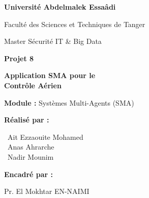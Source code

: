 \documentclass[12pt,a4paper]{article}
\begin{document}
\begin{titlepage}

    \centering
    \vspace*{1.5cm}

    {\color{white}\LARGE\bfseries Université Abdelmalek Essaâdi\par}
    \vspace{0.3cm}
    {\color{white}\Large Faculté des Sciences et Techniques de Tanger\par}
    \vspace{0.5cm}
    {\color{white}\large Master Sécurité IT \& Big Data\par}

    \vspace{3cm}

    {\color{primaryblue}\Huge\bfseries Projet 8\par}
    \vspace{0.8cm}
    {\color{darkblue}\LARGE\bfseries Application SMA pour le\\Contrôle Aérien\par}

    \vspace{1cm}
    \begin{tcolorbox}[colback=lightblue!30, colframe=primaryblue, width=0.8\textwidth, arc=5mm, boxrule=1.5pt]
        \centering
        \large\textbf{Module :} Systèmes Multi-Agents (SMA)
    \end{tcolorbox}

    \vspace{2cm}

    \begin{minipage}{0.45\textwidth}
        \begin{flushleft}
            {\Large\textbf{\color{primaryblue}Réalisé par :}\par}
            \vspace{0.5cm}
            {\large
                \textbullet~Ait Ezzaouite Mohamed\\[0.3cm]
                \textbullet~Anas Ahrarche\\[0.3cm]
                \textbullet~Nadir Mounim\par
            }
        \end{flushleft}
    \end{minipage}%
    \hfill
    \begin{minipage}{0.45\textwidth}
        \begin{flushright}
            {\Large\textbf{\color{primaryblue}Encadré par :}\par}
            \vspace{0.5cm}
            {\large
                Pr. El Mokhtar EN-NAIMI\par
            }
        \end{flushright}
    \end{minipage}


\end{titlepage}
\end{document}
